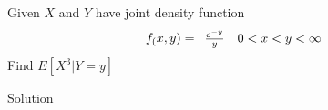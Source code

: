 \documentclass{article}
\begin{document}
\begin{spacing}{1.1}
\newpage
\begin{homeworkProblem}
  Given $X$ and $Y$ have joint density function
  \[
    f_( x, y) = \begin{array}{l l}
      \frac{ e^{-y}}{ y} & 0 < x < y < \infty\\
    \end{array}
  \]
  Find $E[ X^3|Y = y]$
  \begin{homeworkSection}{Solution}

  \end{homeworkSection}
\end{homeworkProblem}
  
\end{spacing}
\end{document}

